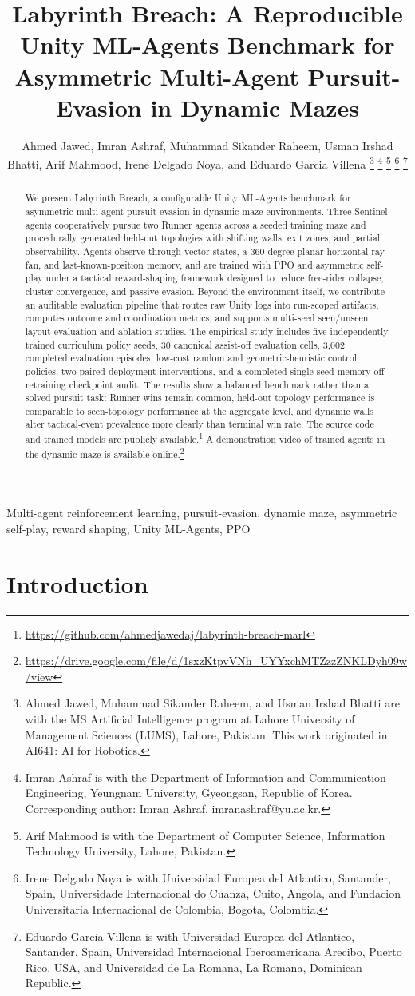\documentclass[journal]{IEEEtran}
\title{Labyrinth Breach: A Reproducible Unity ML-Agents Benchmark for Asymmetric Multi-Agent Pursuit-Evasion in Dynamic Mazes}
\author{Ahmed Jawed, Imran Ashraf, Muhammad Sikander Raheem, Usman Irshad Bhatti, Arif Mahmood, Irene Delgado Noya, and Eduardo Garcia Villena%
\thanks{Ahmed Jawed, Muhammad Sikander Raheem, and Usman Irshad Bhatti are with the MS Artificial Intelligence program at Lahore University of Management Sciences (LUMS), Lahore, Pakistan. This work originated in AI641: AI for Robotics.}%
\thanks{Imran Ashraf is with the Department of Information and Communication Engineering, Yeungnam University, Gyeongsan, Republic of Korea. Corresponding author: Imran Ashraf, imranashraf@yu.ac.kr.}%
\thanks{Arif Mahmood is with the Department of Computer Science, Information Technology University, Lahore, Pakistan.}%
\thanks{Irene Delgado Noya is with Universidad Europea del Atlantico, Santander, Spain, Universidade Internacional do Cuanza, Cuito, Angola, and Fundacion Universitaria Internacional de Colombia, Bogota, Colombia.}%
\thanks{Eduardo Garcia Villena is with Universidad Europea del Atlantico, Santander, Spain, Universidad Internacional Iberoamericana Arecibo, Puerto Rico, USA, and Universidad de La Romana, La Romana, Dominican Republic.}}
\begin{document}
\maketitle

\begin{abstract}
We present Labyrinth Breach, a configurable Unity ML-Agents benchmark for asymmetric multi-agent pursuit-evasion in dynamic maze environments. Three Sentinel agents cooperatively pursue two Runner agents across a seeded training maze and procedurally generated held-out topologies with shifting walls, exit zones, and partial observability. Agents observe through vector states, a 360-degree planar horizontal ray fan, and last-known-position memory, and are trained with PPO and asymmetric self-play under a tactical reward-shaping framework designed to reduce free-rider collapse, cluster convergence, and passive evasion. Beyond the environment itself, we contribute an auditable evaluation pipeline that routes raw Unity logs into run-scoped artifacts, computes outcome and coordination metrics, and supports multi-seed seen/unseen layout evaluation and ablation studies. The empirical study includes five independently trained curriculum policy seeds, 30 canonical assist-off evaluation cells, 3,002 completed evaluation episodes, low-cost random and geometric-heuristic control policies, two paired deployment interventions, and a completed single-seed memory-off retraining checkpoint audit. The results show a balanced benchmark rather than a solved pursuit task: Runner wins remain common, held-out topology performance is comparable to seen-topology performance at the aggregate level, and dynamic walls alter tactical-event prevalence more clearly than terminal win rate. The source code and trained models are publicly available.\footnote{\url{https://github.com/ahmedjawedaj/labyrinth-breach-marl}} A demonstration video of trained agents in the dynamic maze is available online.\footnote{\url{https://drive.google.com/file/d/1sxzKtpvVNh_UYYxchMTZzzZNKLDyh09w/view}}
\end{abstract}

\begin{IEEEkeywords}
Multi-agent reinforcement learning, pursuit-evasion, dynamic maze, asymmetric self-play, reward shaping, Unity ML-Agents, PPO
\end{IEEEkeywords}

\section{Introduction}
\end{document}
